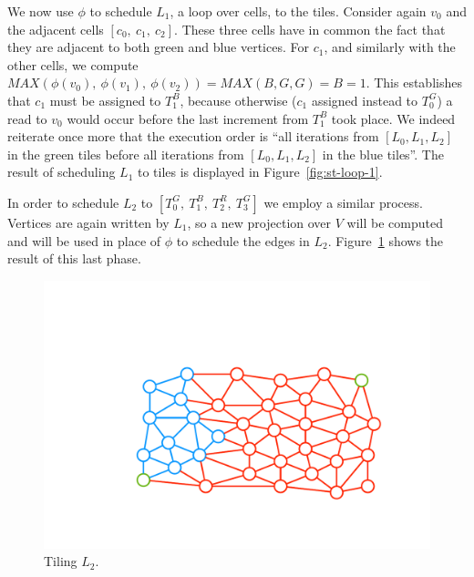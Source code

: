 We now use $\phi$ to schedule $L_1$, a loop over cells, to the tiles. Consider again $v_0$ and the adjacent cells $[c_0,\ c_1,\ c_2]$. These three cells have in common the fact that they are adjacent to both green and blue vertices. For $c_1$, and similarly with the other cells, we compute $MAX(\phi(v_0),\ \phi(v_1),\ \phi(v_2)) = MAX(B, G, G) = B = 1$. This establishes that $c_1$ must be assigned to $T_1^B$, because otherwise ($c_1$ assigned instead to $T_0^G$) a read to $v_0$ would occur before the last increment from $T_1^B$ took place. We indeed reiterate once more that the execution order is ``all iterations from $[L_0, L_1, L_2]$ in the green tiles before all iterations from $[L_0, L_1, L_2]$ in the blue tiles''. The result of scheduling $L_1$ to tiles is displayed in Figure~\ref{fig:st-loop-1}.

In order to schedule $L_2$ to $[T_0^G,\ T_1^B,\ T_2^R,\ T_3^G]$ we employ a similar process. Vertices are again written by $L_1$, so a new projection over $V$ will be computed and will be used in place of $\phi$ to schedule the edges in $L_2$. Figure~\ref{fig:st-loop-2} shows the result of this last phase. 

\begin{figure}[h]
\centering
\includegraphics[width=\textwidth]{sparsetiling/figures/loop_2.pdf}
\caption{Tiling $L_2$.}
\label{fig:st-loop-2}
\end{figure}



